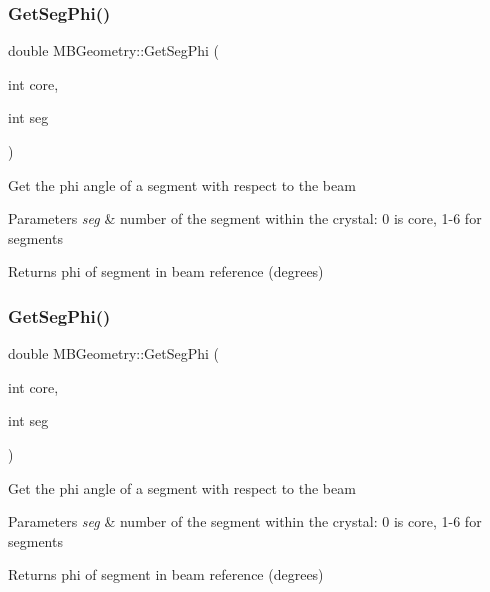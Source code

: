 \subsubsection{\texorpdfstring{Get\+Seg\+Phi()}{GetSegPhi()}\hspace{0.1cm}{\footnotesize\ttfamily [1/2]}}
{\footnotesize\ttfamily double M\+B\+Geometry\+::\+Get\+Seg\+Phi (\begin{DoxyParamCaption}\item[{int}]{core,  }\item[{int}]{seg }\end{DoxyParamCaption})}

Get the phi angle of a segment with respect to the beam 
\begin{DoxyParams}{Parameters}
{\em seg} & number of the segment within the crystal\+: 0 is core, 1-\/6 for segments \\
\hline
\end{DoxyParams}
\begin{DoxyReturn}{Returns}
phi of segment in beam reference (degrees) 
\end{DoxyReturn}
\mbox{\label{class_m_b_geometry_a575ddd6022d2d686a83ebce3195b6c50}} 
\subsubsection{\texorpdfstring{Get\+Seg\+Phi()}{GetSegPhi()}\hspace{0.1cm}{\footnotesize\ttfamily [2/2]}}
{\footnotesize\ttfamily double M\+B\+Geometry\+::\+Get\+Seg\+Phi (\begin{DoxyParamCaption}\item[{int}]{core,  }\item[{int}]{seg }\end{DoxyParamCaption})}

Get the phi angle of a segment with respect to the beam 
\begin{DoxyParams}{Parameters}
{\em seg} & number of the segment within the crystal\+: 0 is core, 1-\/6 for segments \\
\hline
\end{DoxyParams}
\begin{DoxyReturn}{Returns}
phi of segment in beam reference (degrees) 
\end{DoxyReturn}
\mbox{\label{class_m_b_geometry_a49cdf742a2902fc85f0b24dfffa554a8}} 
